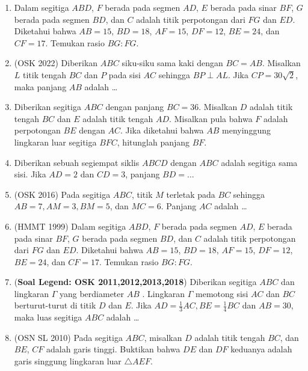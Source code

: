 \documentclass[11pt]{scrartcl}
\begin{document}
\begin{enumerate}
        \item Dalam segitiga $ABD$, $F$ berada pada segmen $AD$, $E$ berada pada sinar $BF$, $G$ berada pada segmen $BD$, dan $C$ adalah titik perpotongan dari $FG$ dan $ED$. Diketahui bahwa $AB = 15$, $BD = 18$, $AF = 15$, $DF = 12$, $BE = 24$, dan $CF = 17$. Temukan rasio $BG : FG$.

    \item (OSK 2022) Diberikan $ABC$ siku-siku sama kaki dengan $BC=AB$. Misalkan $L$ titik tengah $BC$ dan $P$ pada sisi $AC$ sehingga $BP \perp AL$. Jika $CP=30\sqrt{2}$, maka panjang $AB$ adalah \ldots

    \item Diberikan segitiga $ABC$ dengan panjang $BC = 36$. Misalkan $D$ adalah titik tengah $BC$ dan $E$ adalah titik tengah $AD$. Misalkan pula bahwa $F$ adalah perpotongan $BE$ dengan $AC$. Jika diketahui bahwa $AB$ menyinggung lingkaran luar segitiga $BFC$, hitunglah panjang $BF$.

    \item Diberikan sebuah segiempat siklis $ABCD$ dengan $ABC$ adalah segitiga sama sisi. Jika $AD=2$ dan $CD=3$, panjang $BD=\dots$

        \item (OSK 2016) Pada segitiga $ABC$, titik $M$ terletak pada $BC$ sehingga $AB=7, AM=3, BM=5$, dan $MC=6$. Panjang $AC$ adalah \dots

    \item (HMMT 1999) Dalam segitiga $ABD$, $F$ berada pada segmen $AD$, $E$ berada pada sinar $BF$, $G$ berada pada segmen $BD$, dan $C$ adalah titik perpotongan dari $FG$ dan $ED$. Diketahui bahwa $AB = 15$, $BD = 18$, $AF = 15$, $DF = 12$, $BE = 24$, dan $CF = 17$. Temukan rasio $BG : FG$.

    \item (\textbf{Soal Legend: OSK 2011,2012,2013,2018}) Diberikan segitiga $ABC$ dan lingkaran $\Gamma$ yang berdiameter $AB$ . Lingkaran $\Gamma$ memotong sisi $AC$ dan $BC$ berturut-turut di titik $D$ dan $E$. Jika $AD = \frac13 AC, BE =\frac14 BC$ dan $AB = 30$, maka luas segitiga $ABC$ adalah \dots

    \item (OSN SL 2010) Pada segitiga $ABC$, misalkan $D$ adalah titik tengah $BC$, dan $BE$, $CF$ adalah garis tinggi. Buktikan bahwa $DE$ dan $DF$ keduanya adalah garis singgung lingkaran luar $\triangle AEF$. %


\end{enumerate}
\end{document}
